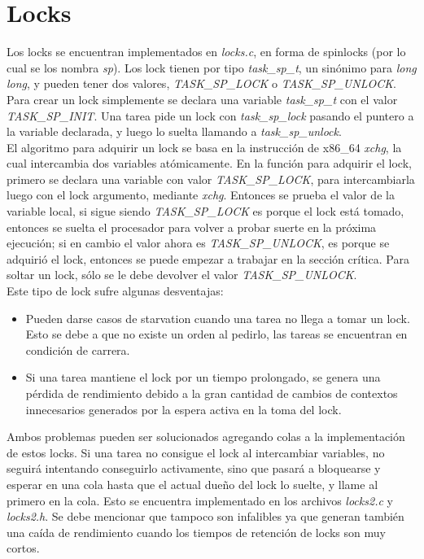 \documentclass[a4paper]{article}
\begin{document}
\section{Locks}
Los locks se encuentran implementados en \textit{locks.c}, en forma
de spinlocks (por lo cual se los nombra \textit{sp}). Los lock tienen
por tipo \textit{task\_sp\_t}, un sin\'onimo para \textit{long long},
y pueden tener dos valores, \textit{TASK\_SP\_LOCK} o 
\textit{TASK\_SP\_UNLOCK}. Para crear un lock simplemente se declara una
variable \textit{task\_sp\_t} con el valor \textit{TASK\_SP\_INIT}. Una
tarea pide un lock con \textit{task\_sp\_lock} pasando el puntero a la
variable declarada, y luego lo suelta llamando a
\textit{task\_sp\_unlock}.\\
El algoritmo para adquirir un lock se basa en la instrucci\'on de x86\_64
\textit{xchg}, la cual intercambia dos variables at\'omicamente. En la
funci\'on para adquirir el lock, primero se declara una variable con
valor \textit{TASK\_SP\_LOCK}, para intercambiarla luego con el lock
argumento, mediante \textit{xchg}. Entonces se prueba el valor de la
variable local, si sigue siendo \textit{TASK\_SP\_LOCK} es porque el
lock est\'a tomado, entonces se suelta el procesador para volver a
probar suerte en la pr\'oxima ejecuci\'on; si en cambio el valor ahora
es \textit{TASK\_SP\_UNLOCK}, es porque se adquiri\'o el lock, entonces
se puede empezar a trabajar en la secci\'on cr\'itica. Para soltar un
lock, s\'olo se le debe devolver el valor \textit{TASK\_SP\_UNLOCK}. \\
Este tipo de lock sufre algunas desventajas:
\begin{itemize}
    \item Pueden darse casos de starvation cuando una tarea no llega
    a tomar un lock. Esto se debe a que no existe un orden al pedirlo,
    las tareas se encuentran en condici\'on de carrera.
    \item Si una tarea mantiene el lock por un tiempo prolongado, se
    genera una p\'erdida de rendimiento debido a la gran cantidad de
    cambios de contextos innecesarios generados por la espera activa
    en la toma del lock.
\end{itemize}
Ambos problemas pueden ser solucionados agregando colas a la
implementaci\'on de estos locks. Si una tarea no consigue el lock al
intercambiar variables, no seguir\'a intentando conseguirlo activamente,
sino que pasar\'a a bloquearse y esperar en una cola hasta que el actual
dueño del lock lo suelte, y llame al primero en la cola. Esto se
encuentra implementado en los archivos \textit{locks2.c} y
\textit{locks2.h}. Se debe mencionar que tampoco son infalibles ya que
generan tambi\'en una ca\'ida de rendimiento cuando los tiempos de
retenci\'on de locks son muy cortos.
\end{document}
